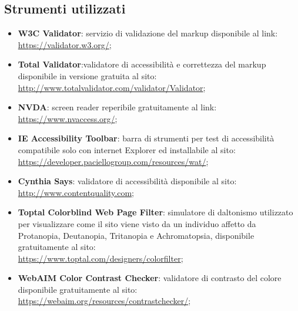 \documentclass[a4paper,12pt]{article}
\begin{document}
\subsection{Strumenti utilizzati}
\begin{itemize}
	\item \textbf{W3C Validator}: servizio di validazione del markup disponibile al link:\\
	\url{https://validator.w3.org/};
	
	\item \textbf{Total Validator}:validatore di accessibilità e correttezza del markup disponibile in versione gratuita al sito:\\
	\url{http://www.totalvalidator.com/validator/Validator};
	
	\item \textbf{NVDA}: screen reader reperibile gratuitamente al link:\\
	\url{https://www.nvaccess.org/};
	
	\item \textbf{IE Accessibility Toolbar}: barra di strumenti per test di accessibilità compatibile solo con internet Explorer ed installabile al sito:\\
	\url{https://developer.paciellogroup.com/resources/wat/};
	
	\item \textbf{Cynthia Says}: validatore di accessibilità disponibile al sito:\\
	\url{http://www.contentquality.com};
	
	\item \textbf{Toptal Colorblind Web Page Filter}: simulatore di daltonismo utilizzato per visualizzare come il sito viene visto da un individuo affetto da Protanopia, Deutanopia, Tritanopia e Achromatopsia, disponibile gratuitamente al sito:\\
	\url{https://www.toptal.com/designers/colorfilter};
	
	\item \textbf{WebAIM Color Contrast Checker}: validatore di contrasto del colore disponibile gratuitamente al sito:\\
	\url{https://webaim.org/resources/contrastchecker/};
\end{itemize}
\end{document}
